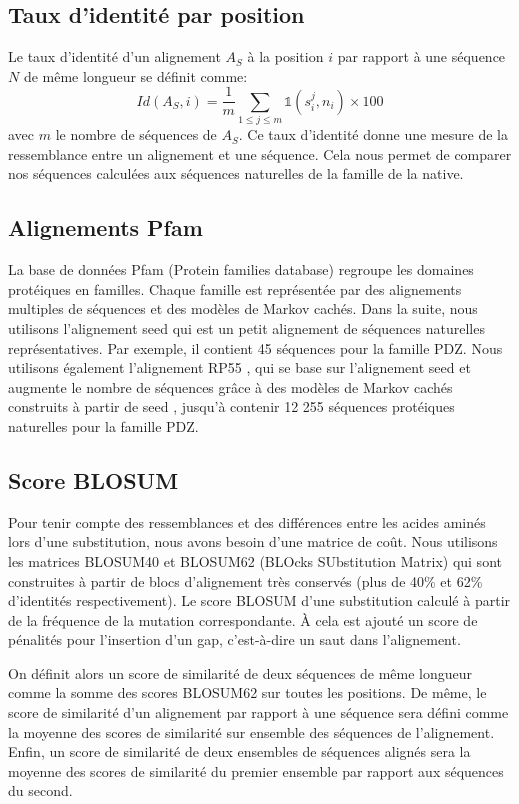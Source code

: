 \subsection{Taux d'identité par position}
\label{TauxID}
Le taux d'identité d'un alignement $A_S$ à la position $i$ par rapport à une séquence $N$ de même longueur se définit comme:
\begin{equation}
Id(A_{S},i) = \frac{1}{m}\sum_{1\leqslant j \leqslant m} \mathds{1}(s_i^j,n_i) \times 100
\end{equation}
avec $m$ le nombre de séquences de $A_S$. Ce taux d'identité donne une mesure de la ressemblance entre un alignement et une séquence. Cela nous permet de comparer nos séquences calculées aux séquences naturelles de la famille de la native.  
\subsection{Alignements Pfam}
\label{sec:Align_Pfam}
La base de données Pfam (Protein families database) \cite{Punta12,Finn14} regroupe les domaines protéiques en familles. Chaque famille est représentée par des alignements multiples de séquences et des modèles de Markov cachés. Dans la suite, nous utilisons l'alignement \og seed \fg qui est un petit alignement de séquences naturelles représentatives. Par exemple, il contient 45 séquences pour la famille PDZ. Nous utilisons également l'alignement \og RP55 \fg, qui se base sur l'alignement \og seed \fg et augmente le nombre de séquences grâce à des  modèles de Markov cachés construits à partir de \og seed \fg, jusqu'à contenir 12 255 séquences protéiques naturelles pour la famille PDZ.

\subsection{Score BLOSUM}

Pour tenir compte des ressemblances et des différences entre les acides aminés lors d'une substitution, nous avons besoin d'une matrice de coût. Nous utilisons les matrices BLOSUM40 et BLOSUM62 (BLOcks SUbstitution Matrix) \cite{Henikoff92} qui sont construites à partir de blocs d'alignement très conservés (plus de 40\% et 62\% d'identités respectivement). Le score BLOSUM d'une substitution calculé à partir de la fréquence de la mutation correspondante. À cela est ajouté un score de pénalités pour l'insertion d'un gap, c'est-à-dire un saut dans l'alignement.

On définit alors un score de similarité de deux séquences de même longueur comme la somme des scores BLOSUM62 sur toutes les positions. De même, le score de similarité d'un alignement par rapport à une séquence sera défini comme la moyenne des scores de similarité sur ensemble des séquences de l'alignement. Enfin, un score de similarité de deux ensembles de séquences alignés sera la moyenne des scores de similarité du premier ensemble par rapport aux séquences du second.  

